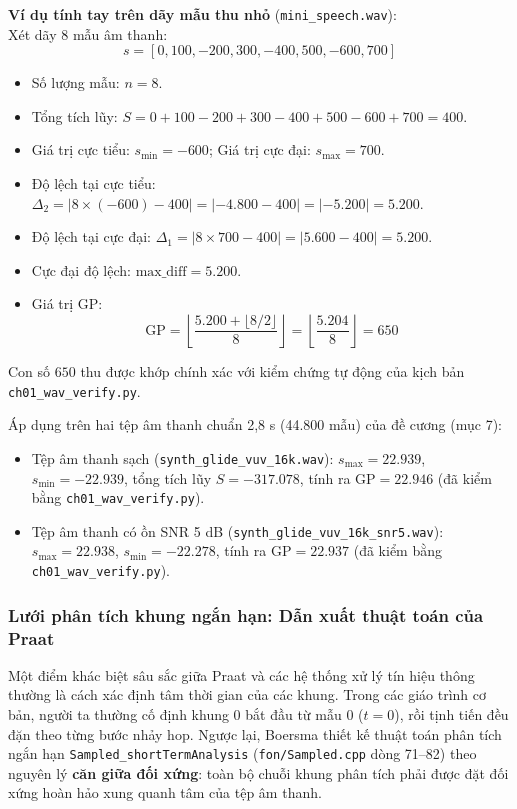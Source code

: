 \textbf{Ví dụ tính tay trên dãy mẫu thu nhỏ} (\texttt{mini\_speech.wav}):\\
Xét dãy 8 mẫu âm thanh:
\begin{equation}
s = [0, 100, -200, 300, -400, 500, -600, 700]
\end{equation}
\begin{itemize}[leftmargin=1.5em, itemsep=2pt]
    \item Số lượng mẫu: $n = 8$.
    \item Tổng tích lũy: $S = 0 + 100 - 200 + 300 - 400 + 500 - 600 + 700 = 400$.
    \item Giá trị cực tiểu: $s_{\min} = -600$; Giá trị cực đại: $s_{\max} = 700$.
    \item Độ lệch tại cực tiểu: $\Delta_2 = |8 \times (-600) - 400| = |-4.800 - 400| = |-5.200| = 5.200$.
    \item Độ lệch tại cực đại: $\Delta_1 = |8 \times 700 - 400| = |5.600 - 400| = 5.200$.
    \item Cực đại độ lệch: $\text{max\_diff} = 5.200$.
    \item Giá trị GP:
    \begin{equation}
    \text{GP} = \left\lfloor \frac{5.200 + \lfloor 8 / 2 \rfloor}{8} \right\rfloor = \left\lfloor \frac{5.204}{8} \right\rfloor = 650
    \end{equation}
\end{itemize}
Con số $650$ thu được khớp chính xác với kiểm chứng tự động của kịch bản \texttt{ch01\_wav\_verify.py}.

Áp dụng trên hai tệp âm thanh chuẩn 2,8 s (44.800 mẫu) của đề cương (mục 7):
\begin{itemize}[leftmargin=1.5em, itemsep=2pt]
    \item Tệp âm thanh sạch (\texttt{synth\_glide\_vuv\_16k.wav}): $s_{\max} = 22.939$, $s_{\min} = -22.939$, tổng tích lũy $S = -317.078$, tính ra $\text{GP} = \mathbf{22.946}$ (đã kiểm bằng \texttt{ch01\_wav\_verify.py}).
    \item Tệp âm thanh có ồn SNR 5 dB (\texttt{synth\_glide\_vuv\_16k\_snr5.wav}): $s_{\max} = 22.938$, $s_{\min} = -22.278$, tính ra $\text{GP} = \mathbf{22.937}$ (đã kiểm bằng \texttt{ch01\_wav\_verify.py}).
\end{itemize}

\subsubsection*{Lưới phân tích khung ngắn hạn: Dẫn xuất thuật toán của Praat}
Một điểm khác biệt sâu sắc giữa Praat và các hệ thống xử lý tín hiệu thông thường là cách xác định tâm thời gian của các khung. Trong các giáo trình cơ bản, người ta thường cố định khung 0 bắt đầu từ mẫu 0 ($t = 0$), rồi tịnh tiến đều đặn theo từng bước nhảy $\text{hop}$. Ngược lại, Boersma thiết kế thuật toán phân tích ngắn hạn \texttt{Sampled\_shortTermAnalysis} (\texttt{fon/Sampled.cpp} dòng 71--82) theo nguyên lý \textbf{căn giữa đối xứng}: toàn bộ chuỗi khung phân tích phải được đặt đối xứng hoàn hảo xung quanh tâm của tệp âm thanh.

